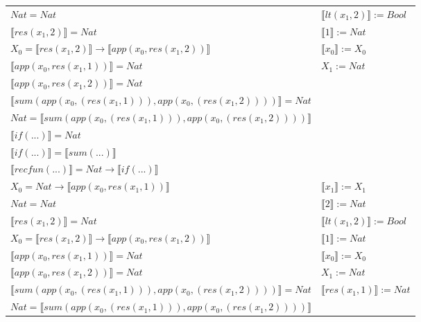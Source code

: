 \begin{exercise}
\begin{description}
\begin{center}
\begin{longtable}[!h]{ | l | l | }
                        $Nat = Nat$ & $ \llbracket lt(x_1 , 2) \rrbracket := Bool$ \\
                        $ \llbracket res(x_1,2) \rrbracket = Nat$ & $ \llbracket 1 \rrbracket := Nat$ \\
                        $X_0 =  \llbracket res(x_1,2) \rrbracket \to  \llbracket app(x_0, res(x_1,2)) \rrbracket$ & $ \llbracket x_0 \rrbracket := X_0$  \\
                        $ \llbracket app(x_0, res(x_1,1)) \rrbracket = Nat$ & $X_1 := Nat$\\
                        $ \llbracket app(x_0, res(x_1,2)) \rrbracket = Nat$ & \\
                        $ \llbracket sum(app(x_0, (res(x_1,1))), app(x_0, (res(x_1,2))))  \rrbracket = Nat$ & \\
                        $Nat =  \llbracket sum(app(x_0, (res(x_1,1))), app(x_0, (res(x_1,2)))) \rrbracket$ & \\
                        $ \llbracket if(...) \rrbracket = Nat$ & \\
                        $ \llbracket if(...) \rrbracket =  \llbracket sum(...) \rrbracket$ & \\
                        $ \llbracket recfun(...) \rrbracket =   Nat  \to  \llbracket if(...) \rrbracket $ & \\
                    \hline
                        $X_0 = Nat \to  \llbracket app(x_0, res(x_1,1)) \rrbracket$ &   $ \llbracket x_1 \rrbracket := X_1$ \\
                        $Nat = Nat$ & $ \llbracket 2 \rrbracket := Nat$ \\
                        $ \llbracket res(x_1,2) \rrbracket = Nat$ & $ \llbracket lt(x_1 , 2) \rrbracket := Bool$ \\
                        $X_0 =  \llbracket res(x_1,2) \rrbracket \to  \llbracket app(x_0, res(x_1,2)) \rrbracket$ &  $ \llbracket 1 \rrbracket := Nat$ \\
                        $ \llbracket app(x_0, res(x_1,1)) \rrbracket = Nat$ & $ \llbracket x_0 \rrbracket := X_0$ \\
                        $ \llbracket app(x_0, res(x_1,2)) \rrbracket = Nat$ & $X_1 := Nat$ \\
                        $ \llbracket sum(app(x_0, (res(x_1,1))), app(x_0, (res(x_1,2))))  \rrbracket = Nat$ & $ \llbracket res(x_1,1) \rrbracket := Nat$ \\
                        $Nat =  \llbracket sum(app(x_0, (res(x_1,1))), app(x_0, (res(x_1,2)))) \rrbracket$ & \\

\end{longtable}
\end{center}
\end{description}
\end{exercise}
